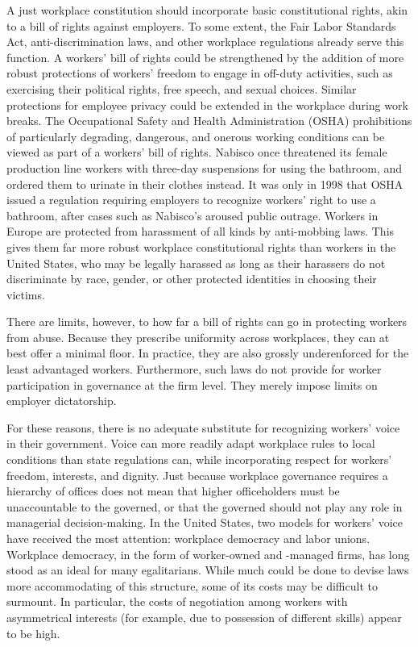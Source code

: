 \documentclass[
  letterpaper,
  11pt,
  DIV=9,
  openright]{scrbook}
\begin{document}
A just workplace constitution should incorporate basic constitutional
rights, akin to a bill of rights against employers. To some extent, the
Fair Labor Standards Act, anti-discrimination laws, and other workplace
regulations already serve this function. A workers' bill of rights could
be strengthened by the addition of more robust protections of workers'
freedom to engage in off-duty activities, such as exercising their
political rights, free speech, and sexual choices. Similar protections
for employee privacy could be extended in the workplace during work
breaks. The Occupational Safety and Health Administration (OSHA)
prohibitions of particularly degrading, dangerous, and onerous working
conditions can be viewed as part of a workers' bill of rights. Nabisco
once threatened its female production line workers with three-day
suspensions for using the bathroom, and ordered them to urinate in their
clothes instead. It was only in 1998 that OSHA issued a regulation
requiring employers to recognize workers' right to use a bathroom, after
cases such as Nabisco's aroused public outrage. Workers in Europe are
protected from harassment of all kinds by anti-mobbing laws. This gives
them far more robust workplace constitutional rights than workers in the
United States, who may be legally harassed as long as their harassers do
not discriminate by race, gender, or other protected identities in
choosing their victims.

There are limits, however, to how far a bill of rights can go in
protecting workers from abuse. Because they prescribe uniformity across
workplaces, they can at best offer a minimal floor. In practice, they
are also grossly underenforced for the least advantaged workers.
Furthermore, such laws do not provide for worker participation in
governance at the firm level. They merely impose limits on employer
dictatorship.

For these reasons, there is no adequate substitute for recognizing
workers' voice in their government. Voice can more readily adapt
workplace rules to local conditions than state regulations can, while
incorporating respect for workers' freedom, interests, and dignity. Just
because workplace governance requires a hierarchy of offices does not
mean that higher officeholders must be unaccountable to the governed, or
that the governed should not play any role in managerial
decision-making. In the United States, two models for workers' voice
have received the most attention: workplace democracy and labor unions.
Workplace democracy, in the form of worker-owned and -managed firms, has
long stood as an ideal for many egalitarians. While much could be done
to devise laws more accommodating of this structure, some of its costs
may be difficult to surmount. In particular, the costs of negotiation
among workers with asymmetrical interests (for example, due to
possession of different skills) appear to be high.
\end{document}
